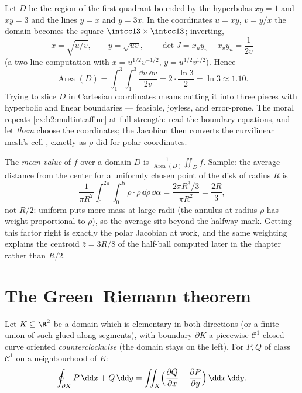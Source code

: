 \begin{example}\label{ex:b2:multint:hyperbolicregion}
Let $D$ be the region of the first quadrant bounded by the
hyperbolas $xy = 1$ and $xy = 3$ and the lines $y = x$ and
$y = 3x$. In the coordinates $u = xy$, $v = y/x$ the domain
becomes the square $\intcc13 \times \intcc13$; inverting,
\[
x = \sqrt{u/v}, \qquad y = \sqrt{uv},
\qquad
\det J = x_uy_v - x_vy_u = \frac{1}{2v}
\]
(a two-line computation with $x = u^{1/2}v^{-1/2}$, $y =
u^{1/2}v^{1/2}$). Hence
\[
\operatorname{Area}(D)
= \int_1^3\!\!\int_1^3\frac{\dd u\,\dd v}{2v}
= 2\cdot\frac{\ln 3}{2} = \ln 3 \approx 1.10 .
\]
Trying to slice $D$ in Cartesian coordinates means cutting it
into three pieces with hyperbolic and linear boundaries ---
feasible, joyless, and error-prone. The moral repeats
\cref{ex:b2:multint:affine} at full strength: read the
boundary equations, and let \emph{them} choose the
coordinates; the Jacobian then converts the curvilinear
mesh's cell , exactly as $\rho$ did for polar
coordinates.
\end{example}

\begin{example}\label{ex:b2:multint:average}
The \emph{mean value} of $f$ over a domain $D$ is
$\frac1{\operatorname{Area}(D)}\iint_Df$. Sample: the average
distance from the center for a uniformly chosen point of the
disk of radius $R$ is
\[
\frac{1}{\pi R^2}\int_0^{2\pi}\!\!\int_0^R
\rho\cdot\rho\,\dd\rho\,\dd\alpha
= \frac{2\pi R^3/3}{\pi R^2} = \frac{2R}3 ,
\]
not $R/2$: uniform  puts more mass at large radii (the
annulus at radius $\rho$ has weight proportional to $\rho$),
so the average sits beyond the halfway mark. Getting this
factor right is exactly the polar Jacobian at work, and the
same weighting explains the centroid $\bar z = 3R/8$ of the
half-ball computed later in the chapter rather than $R/2$.
\end{example}

\section{The Green--Riemann theorem}

\begin{theorem}\label{thm:b2:multint:green}
Let $K \subseteq \R^2$ be a  domain which is elementary in
both directions (or a finite union of such glued along segments),
with boundary $\partial K$ a piecewise $\mathcal{C}^1$ closed
curve oriented \emph{counterclockwise} (the domain stays on the
left). For $P, Q$ of class $\mathcal{C}^1$ on a neighbourhood of
$K$:
\[
\oint_{\partial K} P\,\dd x + Q\,\dd y
= \iint_K \Bigl(\frac{\partial Q}{\partial x}
- \frac{\partial P}{\partial y}\Bigr)\,\dd x\,\dd y .
\]
\end{theorem}

